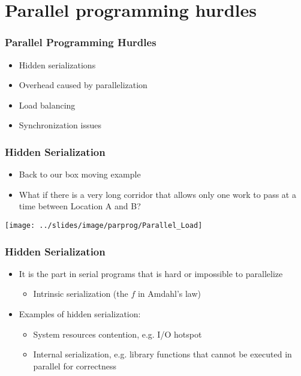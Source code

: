 \documentclass[10pt,t]{beamer}
\begin{document}
\section{Parallel programming hurdles}
\begin{frame}
  \frametitle{Parallel Programming Hurdles}
  \begin{itemize}
  \item Hidden serializations
  \item Overhead caused by parallelization
  \item Load balancing
  \item Synchronization issues
  \end{itemize}
\end{frame}

\begin{frame}
  \frametitle{Hidden Serialization}
  \begin{itemize}
  \item Back to our box moving example
  \item What if there is a very long corridor that allows only one work to pass at a time between Location A and B?
  \end{itemize}
  \texttt{[image: ../slides/image/parprog/Parallel\_Load]}
\end{frame}

\begin{frame}
  \frametitle{Hidden Serialization}
  \begin{itemize}
  \item It is the part in serial programs that is hard or impossible to parallelize
    \begin{itemize}
    \item Intrinsic serialization (the $f$ in Amdahl's law)
    \end{itemize}
  \item Examples of hidden serialization:
    \begin{itemize}
    \item System resources contention, e.g. I/O hotspot
    \item Internal serialization, e.g. library functions that cannot be executed in parallel for correctness
    \end{itemize}
  \end{itemize}
\end{frame}
\end{document}
